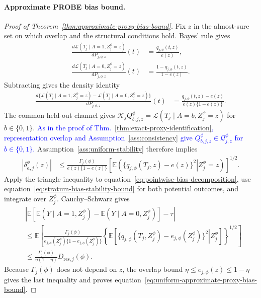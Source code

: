\paragraph{Approximate PROBE bias bound.}
\begin{proof}[Proof of Theorem~\ref{thm:approximate-proxy-bias-bound}]
Fix $z$ in the almost-sure set on which overlap and the structural conditions hold. Bayes' rule gives
\begin{align}
\frac{d\mathcal L(T_j\mid A=1,Z_j^\phi=z)}{dP_{j,\phi,z}}(t)
&=\frac{q_{j,\phi}(t,z)}{e(z)},\\
\frac{d\mathcal L(T_j\mid A=0,Z_j^\phi=z)}{dP_{j,\phi,z}}(t)
&=\frac{1-q_{j,\phi}(t,z)}{1-e(z)}.
\end{align}
Subtracting gives the density identity
\begin{align}
\frac{d\{\mathcal L(T_j\mid A=1,Z_j^\phi=z)
-\mathcal L(T_j\mid A=0,Z_j^\phi=z)\}}
{dP_{j,\phi,z}}(t)
&=
\frac{q_{j,\phi}(t,z)-e(z)}
{e(z)\{1-e(z)\}}.
\label{eq:residual-density-identity}
\end{align}
The common held-out channel gives $\mathcal K_jQ_{b,j,z}^{\phi}=\mathcal L(T_j\mid A=b,Z_j^\phi=z)$ for $b\in\{0,1\}$. \textcolor{blue}{As in the proof of Thm.~\ref{thm:exact-proxy-identification}, representation overlap and Assumption~\ref{ass:consistency} give $Q_{b,j,z}^{\phi}\in\mathcal Q_{j,z}^{\phi}$ for $b\in\{0,1\}$.} Assumption~\ref{ass:uniform-stability} therefore implies
\begin{align}
|\delta_{a,j}^{\phi}(z)|
&\le
\frac{\Gamma_j(\phi)}{e(z)\{1-e(z)\}}
\left[
\mathbb E\!\left(
\left.
\{q_{j,\phi}(T_j,z)-e(z)\}^2
\right|Z_j^\phi=z
\right)
\right]^{1/2}.
\label{eq:stratum-bias-stability-bound}
\end{align}
Apply the triangle inequality to equation~\eqref{eq:pointwise-bias-decomposition}, use equation~\eqref{eq:stratum-bias-stability-bound} for both potential outcomes, and integrate over $Z_j^\phi$. Cauchy--Schwarz gives
\begin{align}
&\left|
\mathbb E\!\left[
\mathbb E(Y\mid A=1,Z_j^\phi)
-
\mathbb E(Y\mid A=0,Z_j^\phi)
\right]
-\tau
\right|
\nonumber\\
&\le
\mathbb E\!\left[
\frac{\Gamma_j(\phi)}
{e_{j,\phi}(Z_j^\phi)\{1-e_{j,\phi}(Z_j^\phi)\}}
\left\{
\mathbb E\!\left[
\left.
\{q_{j,\phi}(T_j,Z_j^\phi)-e_{j,\phi}(Z_j^\phi)\}^2
\right|Z_j^\phi
\right]
\right\}^{1/2}
\right]\\
&\le
\frac{\Gamma_j(\phi)}{\eta(1-\eta)}D_{\mathrm{res},j}(\phi).
\end{align}
Because $\Gamma_j(\phi)$ does not depend on $z$, the overlap bound $\eta\le e_{j,\phi}(z)\le1-\eta$ gives the last inequality and proves equation~\eqref{eq:uniform-approximate-proxy-bias-bound}.
\end{proof}


